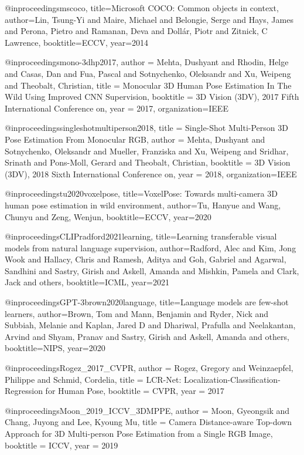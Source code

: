 @inproceedings{mscoco,
  title={Microsoft {COCO}: Common objects in context},
  author={Lin, Tsung-Yi and Maire, Michael and Belongie, Serge and Hays, James and Perona, Pietro and Ramanan, Deva and Doll{\'a}r, Piotr and Zitnick, C Lawrence},
  booktitle=ECCV,
  year={2014}
}

@inproceedings{mono-3dhp2017,
 author = {Mehta, Dushyant and Rhodin, Helge and Casas, Dan and Fua, Pascal and Sotnychenko, Oleksandr and Xu, Weipeng and Theobalt, Christian},
 title = {Monocular {3D} Human Pose Estimation In The Wild Using Improved CNN Supervision},
 booktitle = {3D Vision (3DV), 2017 Fifth International Conference on},
 year = {2017},
 organization={IEEE}
}

@inproceedings{singleshotmultiperson2018,
title = {Single-Shot Multi-Person {3D} Pose Estimation From Monocular RGB},
author = {Mehta, Dushyant and Sotnychenko, Oleksandr and Mueller, Franziska and Xu, Weipeng and Sridhar, Srinath and Pons-Moll, Gerard and Theobalt, Christian},
booktitle = {3D Vision (3DV), 2018 Sixth International Conference on},
year = {2018},
organization={IEEE}
} 

@inproceedings{tu2020voxelpose,
  title={Voxel{P}ose: Towards multi-camera {3D} human pose estimation in wild environment},
  author={Tu, Hanyue and Wang, Chunyu and Zeng, Wenjun},
  booktitle=ECCV,
  year={2020}
}


@inproceedings{CLIPradford2021learning,
  title={Learning transferable visual models from natural language supervision},
  author={Radford, Alec and Kim, Jong Wook and Hallacy, Chris and Ramesh, Aditya and Goh, Gabriel and Agarwal, Sandhini and Sastry, Girish and Askell, Amanda and Mishkin, Pamela and Clark, Jack and others},
  booktitle=ICML,
  year={2021}
}

@inproceedings{GPT-3brown2020language,
  title={Language models are few-shot learners},
  author={Brown, Tom and Mann, Benjamin and Ryder, Nick and Subbiah, Melanie and Kaplan, Jared D and Dhariwal, Prafulla and Neelakantan, Arvind and Shyam, Pranav and Sastry, Girish and Askell, Amanda and others},
  booktitle=NIPS,
  year={2020}
}

@inproceedings{Rogez_2017_CVPR,
  author = {Rogez, Gregory and Weinzaepfel, Philippe and Schmid, Cordelia},
  title = {{LCR-N}et: Localization-Classification-Regression for Human Pose},
  booktitle = CVPR,
  year = {2017}
}

@inproceedings{Moon_2019_ICCV_3DMPPE,
  author = {Moon, Gyeongsik and Chang, Juyong and Lee, Kyoung Mu},
  title = {Camera Distance-aware Top-down Approach for {3D} Multi-person Pose Estimation from a Single RGB Image},
 booktitle = ICCV,
  year = {2019}
}


